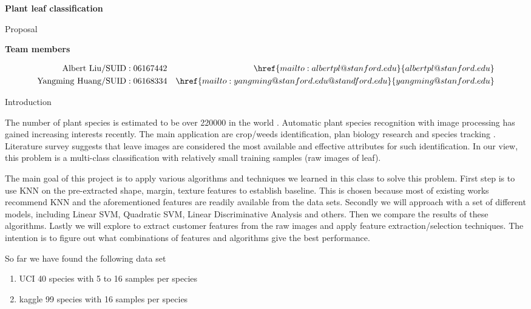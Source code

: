 \documentclass{article}
\begin{document}
\hrulefill \par
{\Large \textbf{Plant leaf classification}\par}
{\Large Proposal\par}
\hrulefill \par
{\bf Team members\par}
\begin{align*}
\mathrm{Albert\ Liu/SUID: 06167442}
  &&\href{mailto:albertpl@stanford.edu}{albertpl@stanford.edu}\\
\mathrm{Yangming\ Huang/SUID: 06168334}
  &&\href{mailto:yangming@stanford.edu@standford.edu}{yangming@stanford.edu}\\
\end{align*}

{\Large Introduction\par}
The number of plant species is estimated to be over 220000 in the world \cite{Charles13}. 
Automatic plant species recognition with image processing has gained increasing
interests recently. The main application are crop/weeds identification, plan
biology research and species tracking \cite{Pedro13}. 
Literature survey suggests that leave images are considered the most available and
effective attributes for such identification.  In our view, this problem is a
multi-class classification with relatively small training samples (raw images of
leaf).

The main goal of this project is to apply various algorithms and techniques we
learned in this class to solve this problem. First step is to use KNN on the
pre-extracted {shape, margin, texture} features to establish baseline. This is chosen
because most of existing works \cite{Charles13} \cite{Pedro13} recommend KNN and
the aforementioned features are readily available from the data sets.  Secondly
we will approach with a set of different models, including Linear SVM, Quadratic SVM,
Linear Discriminative Analysis and others. Then we compare the results of
these algorithms. Lastly we will explore to extract customer features from
the raw images and apply feature extraction/selection techniques. The intention is 
to figure out what combinations of features and algorithms give the best performance.

So far we have found the following data set
\begin{enumerate}
  \item UCI \cite{UCIDataSet} 40 species with 5 to 16 samples per species
  \item kaggle \cite{KaggleDataSet} 99 species with 16 samples per species
\end{enumerate}
\end{document}
